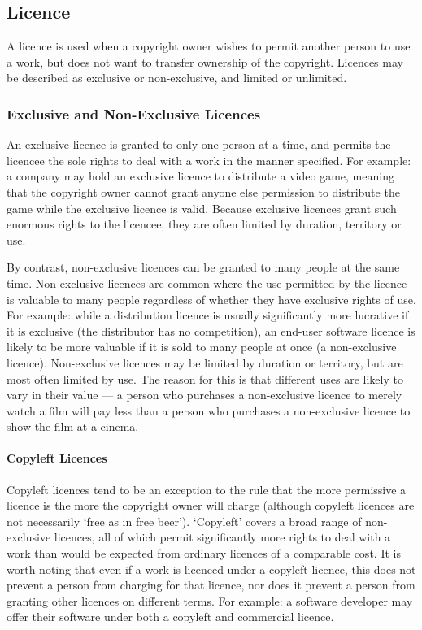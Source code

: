 \documentclass[a4paper,12pt]{article}
\begin{document}
\subsection{Licence}

A licence is used when a copyright owner wishes to permit another person to use a work, but does not want to transfer ownership of the copyright. Licences may be described as exclusive or non-exclusive, and limited or unlimited.

\subsubsection{Exclusive and Non-Exclusive Licences}

An exclusive licence is granted to only one person at a time, and permits the licencee the sole rights to deal with a work in the manner specified. For example: a company may hold an exclusive licence to distribute a video game, meaning that the copyright owner cannot grant anyone else permission to distribute the game while the exclusive licence is valid. Because exclusive licences grant such enormous rights to the licencee, they are often limited by duration, territory or use.

By contrast, non-exclusive licences can be granted to many people at the same time. Non-exclusive licences are common where the use permitted by the licence is valuable to many people regardless of whether they have exclusive rights of use. For example: while a distribution licence is usually significantly more lucrative if it is exclusive (the distributor has no competition), an end-user software licence is likely to be more valuable if it is sold to many people at once (a non-exclusive licence). Non-exclusive licences may be limited by duration or territory, but are most often limited by use. The reason for this is that different uses are likely to vary in their value --- a person who purchases a non-exclusive licence to merely watch a film will pay less than a person who purchases a non-exclusive licence to show the film at a cinema.

\paragraph{Copyleft Licences}

Copyleft licences tend to be an exception to the rule that the more permissive a licence is the more the copyright owner will charge (although copyleft licences are not necessarily `free as in free beer'). `Copyleft' covers a broad range of non-exclusive licences, all of which permit significantly more rights to deal with a work than would be expected from ordinary licences of a comparable cost. It is worth noting that even if a work is licenced under a copyleft licence, this does not prevent a person from charging for that licence, nor does it prevent a person from granting other licences on different terms. For example: a software developer may offer their software under both a copyleft and commercial licence.
\end{document}
